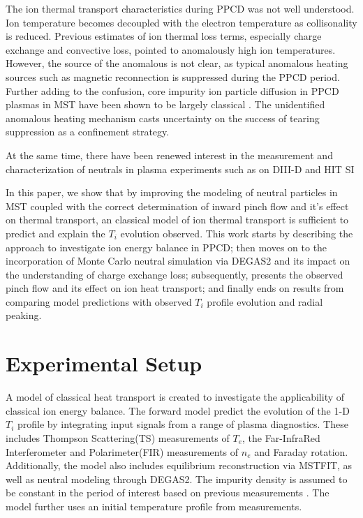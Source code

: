 \documentclass[aip, pop, preprint]{revtex4-1}
\begin{document}
The ion thermal transport characteristics during PPCD was not well understood.
Ion temperature becomes decoupled with the electron temperature as
collisonality is reduced. Previous estimates of ion thermal loss terms,
especially charge exchange and convective loss, pointed to anomalously high ion
temperatures\cite{Fiksel2006Confinement, Wyman2007THEPLASMAS, BiewerThesis}.
However, the source of the anomalous is not clear, as typical anomalous heating 
sources such as magnetic reconnection is suppressed during the PPCD period.
Further adding to the confusion, core impurity ion particle diffusion in PPCD
plasmas in MST have been shown to be largely classical \cite{Kumar12prl}. The
unidentified anomalous heating mechanism casts uncertainty on the success of
tearing suppression as a confinement strategy.

At the same time, there have been renewed interest in the measurement and
characterization of neutrals in plasma experiments such as on DIII-D\cite{} and
HIT SI

In this paper, we show that by improving the modeling of neutral particles in
MST coupled with the correct determination of inward pinch flow and it's effect
on thermal transport, an classical model of ion thermal transport is sufficient
to predict and explain the $T_i$ evolution observed. This work starts by
describing the approach to investigate ion energy balance in PPCD; then moves
on to the incorporation of Monte Carlo neutral simulation via DEGAS2 and its
impact on the understanding of charge exchange loss; subsequently, presents the
observed pinch flow and its effect on ion heat transport; and finally ends
on results from comparing model predictions with observed $T_{i}$ profile
evolution and radial peaking.

\section{Experimental Setup}

A model of classical heat transport is created to investigate the applicability
of classical ion energy balance. The forward model predict the evolution of the
1-D $T_i$ profile by integrating input signals from a range of plasma
diagnostics. These includes Thompson Scattering(TS) measurements of $T_e$, the
Far-InfraRed Interferometer and Polarimeter(FIR) measurements of $n_e$ and
Faraday rotation. Additionally, the model also includes equilibrium
reconstruction via MSTFIT\cite{Anderson04}, as well as neutral modeling through
DEGAS2. The impurity density is assumed to be constant in the period of
interest based on previous measurements \cite{Kumar12pop,Nornberg18FST}. The
model further uses an initial temperature profile from measurements. 
\end{document}
